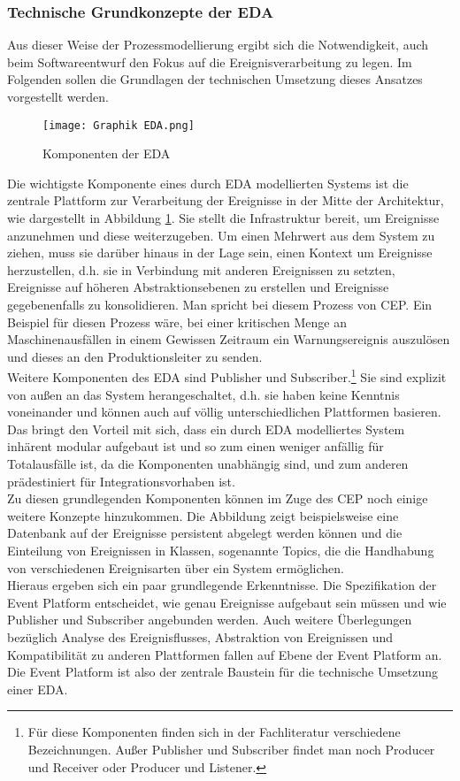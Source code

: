 \subsubsection*{Technische Grundkonzepte der \ac{EDA}}
Aus dieser Weise der Prozessmodellierung ergibt sich die Notwendigkeit, auch beim Softwareentwurf den Fokus auf die Ereignisverarbeitung zu legen. Im Folgenden sollen die Grundlagen der technischen Umsetzung dieses Ansatzes vorgestellt werden.
\begin{figure}[H]
  \centering
	\texttt{[image: Graphik EDA.png]}
  \caption[Komponenten der Event-Driven Architecture]{Komponenten der \acl{EDA}\ \cite[][S. 249]{CLOUD2021}}
  \label{EDAbasics}
\end{figure}

Die wichtigste Komponente eines durch \ac{EDA} modellierten Systems ist die zentrale Plattform zur Verarbeitung der Ereignisse in der Mitte der Architektur, wie dargestellt in Abbildung \ref{EDAbasics}. Sie stellt die Infrastruktur bereit, um Ereignisse anzunehmen und diese weiterzugeben. Um einen Mehrwert aus dem System zu ziehen, muss sie darüber hinaus in der Lage sein, einen Kontext um Ereignisse herzustellen, d.h. sie in Verbindung mit anderen Ereignissen zu setzten, Ereignisse auf höheren Abstraktionsebenen zu erstellen und Ereignisse gegebenenfalls zu konsolidieren. Man spricht bei diesem Prozess von \ac{CEP}. Ein Beispiel für diesen Prozess wäre, bei einer kritischen Menge an Maschinenausfällen in einem Gewissen Zeitraum ein Warnungsereignis auszulösen und dieses an den Produktionsleiter zu senden.\\
Weitere Komponenten des \ac{EDA} sind Publisher und Subscriber.\footnote{Für diese Komponenten finden sich in der Fachliteratur verschiedene Bezeichnungen. Außer Publisher und Subscriber findet man noch Producer und Receiver oder Producer und Listener.} Sie sind explizit von außen an das System herangeschaltet, d.h. sie haben keine Kenntnis voneinander und können auch auf völlig unterschiedlichen Plattformen basieren. Das bringt den Vorteil mit sich, dass ein durch \ac{EDA} modelliertes System inhärent modular aufgebaut ist und so zum einen weniger anfällig für Totalausfälle ist, da die Komponenten unabhängig sind, und zum anderen prädestiniert für Integrationsvorhaben ist.\\
Zu diesen grundlegenden Komponenten können im Zuge des \ac{CEP} noch einige weitere Konzepte hinzukommen. Die Abbildung zeigt beispielsweise eine Datenbank auf der Ereignisse persistent abgelegt werden können und die Einteilung von Ereignissen in Klassen, sogenannte Topics, die die Handhabung von verschiedenen Ereignisarten über ein System ermöglichen.\\
Hieraus ergeben sich ein paar grundlegende Erkenntnisse. Die Spezifikation der Event Platform entscheidet, wie genau Ereignisse aufgebaut sein müssen und wie Publisher und Subscriber angebunden werden. Auch weitere Überlegungen bezüglich Analyse des Ereignisflusses, Abstraktion von Ereignissen und Kompatibilität zu anderen Plattformen fallen auf Ebene der Event Platform an. Die Event Platform ist also der zentrale Baustein für die technische Umsetzung einer \ac{EDA}. \cite[Vgl. ][S. 244]{CLOUD2021}
